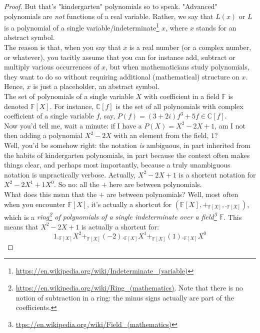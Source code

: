 \documentclass[solutions.tex]{subfiles}
\begin{document}
\begin{proof}
But that's "kindergarten" polynomials so to speak. "Advanced"
polynomials are \textit{not} functions of a real variable. Rather,
we say that $L(x)$ or $L$ is a polynomial of a single
variable/indeterminate\footnote{
\url{https://en.wikipedia.org/wiki/Indeterminate\_(variable)}} $x$, where
$x$ stands for an abstract symbol. \\

The reason is that, when you say that $x$ is a real number (or
a complex number, or whatever), you tacitly assume that you can
for instance add, subtract or multiply various occurrences of
$x$, but when mathematicians study polynomials, they want to do
so without requiring additional (mathematical) structure on $x$. \\

Hence, $x$ is just a placeholder, an abstract symbol. \\

The set of polynomials of a single variable $X$ with coefficient
in a field $\mathbb{F}$ is denoted $\mathbb{F}[X]$. For instance,
$\mathbb{C}[f]$ is the set of all polynomials with complex
coefficient of a single variable $f$, say,
$P(f) = (3+2i)f^3 + 5f \in \mathbb{C}[f]$. \\

Now you'd tell me, wait a minute: if I have a $P(X) = X^2 - 2X +1$,
am I not then adding a polynomial $X^2-2X$ with an element from
the field, $1$? \\

Well, you'd be somehow right: the notation \textit{is} ambiguous, in
part inherited from the habits of kindergarten polynomials, in part
because the context often makes things clear, and perhaps
most importantly, because a truly unambiguous notation is unpractically
verbose. Actually, $X^2 - 2X +1$ is a shortcut
notation for $X^2 - 2X^1 +1 X^0$. So no: all the $+$ here are between
polynomials. \\

What does this mean that the $+$ are between polynomials? Well, most
often when you encounter $\mathbb{F}[X]$, it's actually
a shortcut for $(\mathbb{F}[X], +_{\mathbb{F}[X]}, ._{\mathbb{F}[X]})$,
which is a \textit{ring\footnote{\url{
https://en.wikipedia.org/wiki/Ring\_(mathematics)}. Note that there
is no notion of subtraction in a ring: the minus signs actually are
part of the coefficients.} of polynomials of a single indeterminate
over a field\footnote{\url{
ttps://en.wikipedia.org/wiki/Field\_(mathematics)}} $\mathbb{F}$}.
This means that  $X^2 - 2X +1$ is actually a shortcut for:
\[
	1._{\mathbb{F}[X]}X^2 +_{\mathbb{F}[X]} (-2)._{\mathbb{F}[X]}X^1
		+_{\mathbb{F}[X]} (1)._{\mathbb{F}[X]}X^0
\]


\end{proof}
\end{document}
